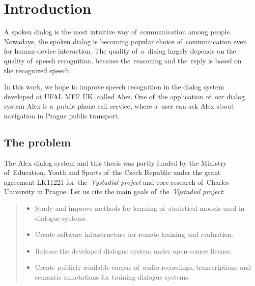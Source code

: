 \chapter{Introduction}
\label{chap:intro}

% 
% 
% 

A spoken dialog is the most intuitive way of~communication among people. Nowadays, the spoken dialog is becoming popular choice of~communication even for human-device interaction. The quality of~a~dialog largely depends on the quality of~speech recognition, because the~reasoning and the~reply is based on the recognized speech. 

In this work, we hope to improve speech recognition in the dialog system developed at \acs{UFAL} \acs{MFF} \acs{UK}, called Alex. One of~the application of~our dialog system Alex is a~public phone call service, where a~user can ask Alex about navigation in Prague public transport.

\section{The problem} 
\label{sec:why}
The Alex dialog system and this thesis was partly funded by the Ministry of~Education, Youth and Sports
of~the Czech Republic under the grant agreement LK11221 for~the~{\it Vystadial project}\/ and core research of~Charles University in Prague.
Let us cite the main goals of~the~{\it Vystadial project}\cite{jurcicek2012vystadial}:
\begin{quote}
    \begin{itemize}
        \item Study and improve methods for learning of~statistical models used in dialogue systems. 
        \item Create software infrastructure for remote training and evaluation.
        \item Release the developed dialogue system under open-source license.
        \item Create publicly available corpus of~audio recordings, transcriptions and semantic annotations for training dialogue systems.
    \end{itemize}
\end{quote}

